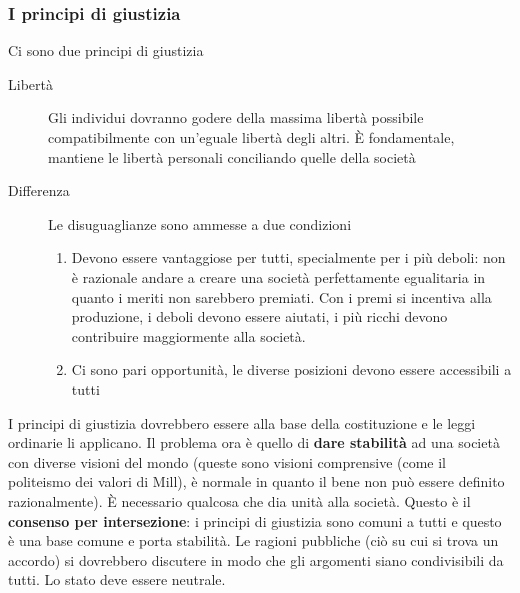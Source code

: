 \subsubsection{I principi di giustizia}
Ci sono due principi di giustizia
\begin{description}
  \item[Libertà] Gli individui dovranno godere della massima libertà possibile compatibilmente con
    un'eguale libertà degli altri. È fondamentale, mantiene le libertà personali conciliando quelle
    della società
  \item[Differenza] Le disuguaglianze sono ammesse a due condizioni
    \begin{enumerate}
      \item Devono essere vantaggiose per tutti, specialmente per i più deboli: non è razionale 
        andare a creare una società perfettamente egualitaria in quanto i meriti non sarebbero 
        premiati. Con i premi si incentiva alla produzione, i deboli devono essere aiutati, i più 
        ricchi devono contribuire maggiormente alla società.
      \item Ci sono pari opportunità, le diverse posizioni devono essere accessibili a tutti
    \end{enumerate}
\end{description}
I principi di giustizia dovrebbero essere alla base della costituzione e le leggi ordinarie li 
applicano. Il problema ora è quello di \textbf{dare stabilità} ad una società con diverse visioni
del mondo (queste sono visioni comprensive (come il politeismo dei valori di Mill), è normale in
quanto il bene non può essere definito razionalmente). È necessario qualcosa che dia unità alla
società. Questo è il \textbf{consenso per intersezione}: i principi di giustizia sono comuni a tutti
e questo è una base comune e porta stabilità. Le ragioni pubbliche (ciò su cui si trova un accordo)
si dovrebbero discutere in modo che gli argomenti siano condivisibili da tutti. Lo stato deve essere
neutrale.
